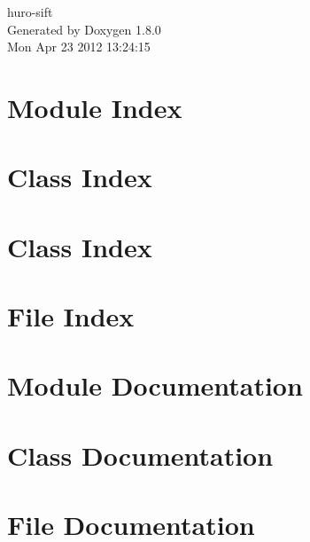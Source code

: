 \documentclass{book}
\begin{document}
\hypersetup{pageanchor=false,citecolor=blue}
\begin{titlepage}
\vspace*{7cm}
\begin{center}
{\Large huro-\/sift }\\
\vspace*{1cm}
{\large Generated by Doxygen 1.8.0}\\
\vspace*{0.5cm}
{\small Mon Apr 23 2012 13:24:15}\\
\end{center}
\end{titlepage}
\clearemptydoublepage
{}
\tableofcontents
\clearemptydoublepage
{}
\hypersetup{pageanchor=true,citecolor=blue}
\chapter{Module Index}

\chapter{Class Index}

\chapter{Class Index}

\chapter{File Index}

\chapter{Module Documentation}



\chapter{Class Documentation}












\chapter{File Documentation}

























\printindex
\end{document}
